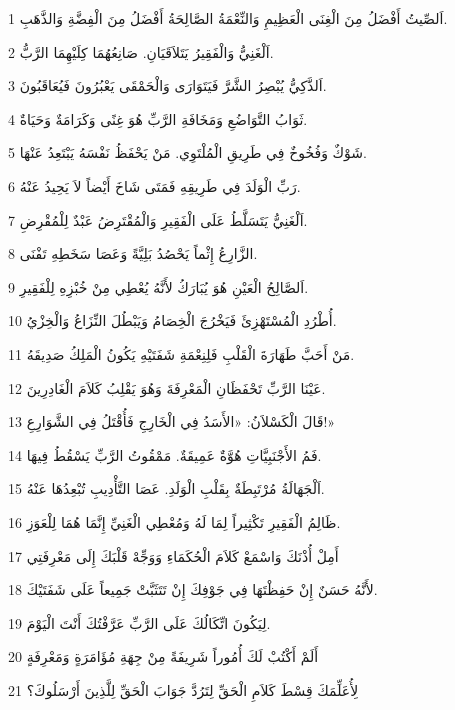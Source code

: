 \par 1 اَلصِّيتُ أَفْضَلُ مِنَ الْغِنَى الْعَظِيمِ وَالنِّعْمَةُ الصَّالِحَةُ أَفْضَلُ مِنَ الْفِضَّةِ وَالذَّهَبِ.
\par 2 اَلْغَنِيُّ وَالْفَقِيرُ يَتَلاَقَيَانِ. صَانِعُهُمَا كِلَيْهِمَا الرَّبُّ.
\par 3 اَلذَّكِيُّ يُبْصِرُ الشَّرَّ فَيَتَوَارَى وَالْحَمْقَى يَعْبُرُونَ فَيُعَاقَبُونَ.
\par 4 ثَوَابُ التَّوَاضُعِ وَمَخَافَةِ الرَّبِّ هُوَ غِنًى وَكَرَامَةٌ وَحَيَاةٌ.
\par 5 شَوْكٌ وَفُخُوخٌ فِي طَرِيقِ الْمُلْتَوِي. مَنْ يَحْفَظُ نَفْسَهُ يَبْتَعِدُ عَنْهَا.
\par 6 رَبِّ الْوَلَدَ فِي طَرِيقِهِ فَمَتَى شَاخَ أَيْضاً لاَ يَحِيدُ عَنْهُ.
\par 7 اَلْغَنِيُّ يَتَسَلَّطُ عَلَى الْفَقِيرِ وَالْمُقْتَرِضُ عَبْدٌ لِلْمُقْرِضِ.
\par 8 الزَّارِعُ إِثْماً يَحْصُدُ بَلِيَّةً وَعَصَا سَخَطِهِ تَفْنَى.
\par 9 اَلصَّالِحُ الْعَيْنِ هُوَ يُبَارَكُ لأَنَّهُ يُعْطِي مِنْ خُبْزِهِ لِلْفَقِيرِ.
\par 10 أُطْرُدِ الْمُسْتَهْزِئَ فَيَخْرُجَ الْخِصَامُ وَيَبْطُلَ النِّزَاعُ وَالْخِزْيُ.
\par 11 مَنْ أَحَبَّ طَهَارَةَ الْقَلْبِ فَلِنِعْمَةِ شَفَتَيْهِ يَكُونُ الْمَلِكُ صَدِيقَهُ.
\par 12 عَيْنَا الرَّبِّ تَحْفَظَانِ الْمَعْرِفَةَ وَهُوَ يَقْلِبُ كَلاَمَ الْغَادِرِينَ.
\par 13 قَالَ الْكَسْلاَنُ: «الأَسَدُ فِي الْخَارِجِ فَأُقْتَلُ فِي الشَّوَارِعِ!»
\par 14 فَمُ الأَجْنَبِيَّاتِ هُوَّةٌ عَمِيقَةٌ. مَمْقُوتُ الرَّبِّ يَسْقُطُ فِيهَا.
\par 15 اَلْجَهَالَةُ مُرْتَبِطَةٌ بِقَلْبِ الْوَلَدِ. عَصَا التَّأْدِيبِ تُبْعِدُهَا عَنْهُ.
\par 16 ظَالِمُ الْفَقِيرِ تَكْثِيراً لِمَا لَهُ وَمُعْطِي الْغَنِيِّ إِنَّمَا هُمَا لِلْعَوَزِ.
\par 17 أَمِلْ أُذْنَكَ وَاسْمَعْ كَلاَمَ الْحُكَمَاءِ وَوَجِّهْ قَلْبَكَ إِلَى مَعْرِفَتِي
\par 18 لأَنَّهُ حَسَنٌ إِنْ حَفِظْتَهَا فِي جَوْفِكَ إِنْ تَتَثَبَّتْ جَمِيعاً عَلَى شَفَتَيْكَ.
\par 19 لِيَكُونَ اتِّكَالُكَ عَلَى الرَّبِّ عَرَّفْتُكَ أَنْتَ الْيَوْمَ.
\par 20 أَلَمْ أَكْتُبْ لَكَ أُمُوراً شَرِيفَةً مِنْ جِهَةِ مُؤَامَرَةٍ وَمَعْرِفَةٍ
\par 21 لِأُعَلِّمَكَ قِسْطَ كَلاَمِ الْحَقِّ لِتَرُدَّ جَوَابَ الْحَقِّ لِلَّذِينَ أَرْسَلُوكَ؟
